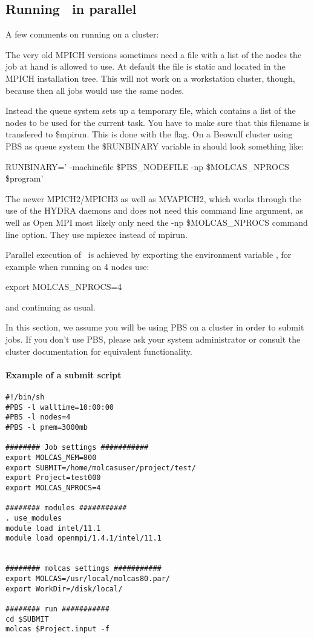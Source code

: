 \subsection{Running \molcas\ in parallel}

A few comments on running on a cluster:

The very old MPICH versions sometimes need a file with a list of the nodes the job at hand is allowed
to use.  At default the file is static and located in the MPICH installation
tree.  This will not work on a workstation cluster, though, because then all
jobs would use the same nodes.

Instead the queue system sets up a temporary file, which contains a list of the
nodes to be used for the current task.  You have to make sure that this filename
is transfered to \$mpirun.  This is done with the  flag. On a
Beowulf cluster using PBS as queue system the \$RUNBINARY variable in
 should look something like:

RUNBINARY=' -machinefile \$PBS\_NODEFILE -np \$MOLCAS\_NPROCS
\$program'

The newer MPICH2/MPICH3 as well as MVAPICH2, which works through the use of the HYDRA daemons and does not need
this command line argument, as well as Open MPI most likely only need the -np
\$MOLCAS\_NPROCS command line option.  They use mpiexec instead of mpirun.

Parallel execution of \molcas\ is achieved by exporting the environment
variable , for example when running on 4 nodes use:
\begin{sourcelisting}
export MOLCAS_NPROCS=4
\end{sourcelisting}

and continuing as usual.

In this section, we assume you will be using PBS on a cluster in order to
submit jobs. If you don't use PBS, please ask your system administrator or
consult the cluster documentation for equivalent functionality.

\paragraph{Example of a submit script}

\begin{verbatim}
#!/bin/sh
#PBS -l walltime=10:00:00
#PBS -l nodes=4
#PBS -l pmem=3000mb

######## Job settings ###########
export MOLCAS_MEM=800
export SUBMIT=/home/molcasuser/project/test/
export Project=test000
export MOLCAS_NPROCS=4

######## modules ###########
. use_modules
module load intel/11.1
module load openmpi/1.4.1/intel/11.1


######## molcas settings ###########
export MOLCAS=/usr/local/molcas80.par/
export WorkDir=/disk/local/

######## run ###########
cd $SUBMIT
molcas $Project.input -f

\end{verbatim}

